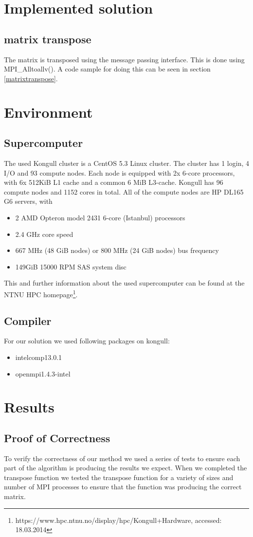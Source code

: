 \documentclass{article}
\begin{document}
\section{Implemented solution}
\subsection{matrix transpose}
The matrix is transposed using the message passing interface. This is done using MPI\_Alltoallv(). A code sample for doing this can be seen in section \ref{matrixtranspose}.
\section{Environment}
\subsection{Supercomputer}
The used Kongull cluster is a CentOS 5.3 Linux cluster. The cluster has 1 login, 4 I/O and 93 compute nodes. Each node is equipped with 2x 6-core processors, with 6x 512KiB L1 cache and a common 6 MiB L3-cache. Kongull has 96 compute nodes and 1152 cores in total. All of the compute nodes are HP DL165 G6 servers, with
\begin{itemize}
\item 2 AMD Opteron model 2431 6-core (Istanbul) processors
\item 2.4 GHz core speed
\item 667 MHz (48 GiB nodes) or 800 MHz (24 GiB nodes) bus frequency
\item 149GiB 15000 RPM SAS system disc
\end{itemize}
This and further information about the used supercomputer can be found at the NTNU HPC homepage\footnote{https://www.hpc.ntnu.no/display/hpc/Kongull+Hardware, accessed: 18.03.2014}.
\subsection{Compiler}

For our solution we used following packages on kongull:
\begin{itemize}
\item intelcomp13.0.1
\item openmpi1.4.3-intel
\end{itemize}
\section{Results}
\subsection{Proof of Correctness}
	To verify the correctness of our method we used a series of tests to ensure each part of the algorithm is producing the results we expect. When we completed the transpose function we tested the transpose function for a variety of sizes and number of MPI processes to ensure that the function was producing the correct matrix. 
\end{document}
